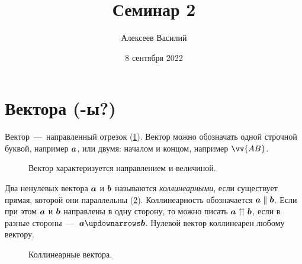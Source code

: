\documentclass[a4paper,12pt]{article}
\author{Алексеев Василий}
\title{Семинар 2}
\date{8 сентября 2022}
\begin{document}
  \maketitle
  
  \tableofcontents

  \thispagestyle{empty}
  
  \newpage
  


  \section{Вектора (-ы?)}
  
  Вектор~---~направленный отрезок (\ref{fig:vector}).
  Вектор можно обозначать одной строчной буквой, например $\boldsymbol a$, или двумя: началом и концом, например $\vv{AB}$.
  
  \begin{figure}[h]
    \centering
    
    
    \caption{Вектор характеризуется направлением и величиной.}
    \label{fig:vector}
  \end{figure}
  
  \begin{definition}[Коллинеарность]
    Два ненулевых вектора $\boldsymbol a$ и $\boldsymbol b$ называются \emph{коллинеарными}, если существует прямая, которой они параллельны (\ref{fig:collinearity}).
    Коллинеарность обозначается $\bds a \hm\parallel \bds b$.
    Если при этом $\boldsymbol a$ и $\boldsymbol b$ направлены в одну сторону, то можно писать $\bds a \hm\upuparrows \bds b$,
    если в разные стороны~---~$\bds a \hm\updownarrows \bds b$.
    Нулевой вектор коллинеарен любому вектору.
  \end{definition}
  
  \begin{figure}[h]
    \centering
    
    
    \caption{Коллинеарные вектора.}
    \label{fig:collinearity}
  \end{figure}
  
\end{document}
